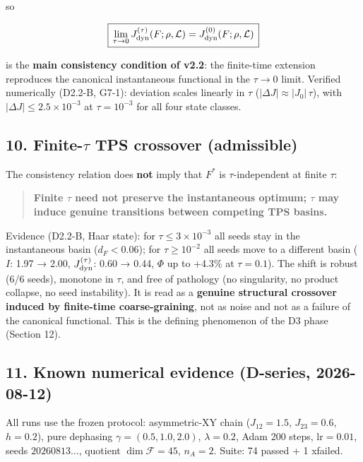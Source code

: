 \documentclass[
]{article}
\begin{document}
so

\[
\boxed{\,
\lim_{\tau\to0} J_{\rm dyn}^{(\tau)}(F;\rho,\mathcal L)
= J_{\rm dyn}^{(0)}(F;\rho,\mathcal L)
\,}
\]

is the \textbf{main consistency condition of v2.2}: the finite-time
extension reproduces the canonical instantaneous functional in the
\(\tau\to0\) limit. Verified numerically (D2.2-B, G7-1): deviation
scales linearly in \(\tau\) (\(|\Delta J| \approx |J_0|\,\tau\)), with
\(|\Delta J| \le 2.5\times10^{-3}\) at \(\tau = 10^{-3}\) for all four
state classes.

\subsection{\texorpdfstring{10. Finite-\(\tau\) TPS crossover
(admissible)}{10. Finite-\textbackslash tau TPS crossover (admissible)}}\label{finite-tau-tps-crossover-admissible}

The consistency relation does \textbf{not} imply that \(F^*\) is
\(\tau\)-independent at finite \(\tau\):

\begin{quote}
\textbf{Finite \(\tau\) need not preserve the instantaneous optimum;
\(\tau\) may induce genuine transitions between competing TPS basins.}
\end{quote}

Evidence (D2.2-B, Haar state): for \(\tau \le 3\times10^{-3}\) all seeds
stay in the instantaneous basin (\(d_F < 0.06\)); for
\(\tau \ge 10^{-2}\) all seeds move to a different basin (\(I\): 1.97 →
2.00, \(J_{\rm dyn}^{(\tau)}\): 0.60 → 0.44, \(\Phi\) up to +4.3\% at
\(\tau = 0.1\)). The shift is robust (6/6 seeds), monotone in \(\tau\),
and free of pathology (no singularity, no product collapse, no seed
instability). It is read as a \textbf{genuine structural crossover
induced by finite-time coarse-graining}, not as noise and not as a
failure of the canonical functional. This is the defining phenomenon of
the D3 phase (Section 12).

\subsection{11. Known numerical evidence (D-series,
2026-08-12)}\label{known-numerical-evidence-d-series-2026-08-12}

All runs use the frozen protocol: asymmetric-XY chain (\(J_{12}=1.5\),
\(J_{23}=0.6\), \(h=0.2\)), pure dephasing \(\gamma=(0.5,1.0,2.0)\),
\(\lambda=0.2\), Adam 200 steps, \(\mathrm{lr}=0.01\), seeds
\(20260813\ldots\), quotient \(\dim\mathcal F=45\), \(n_A=2\). Suite: 74
passed + 1 xfailed.
\end{document}
